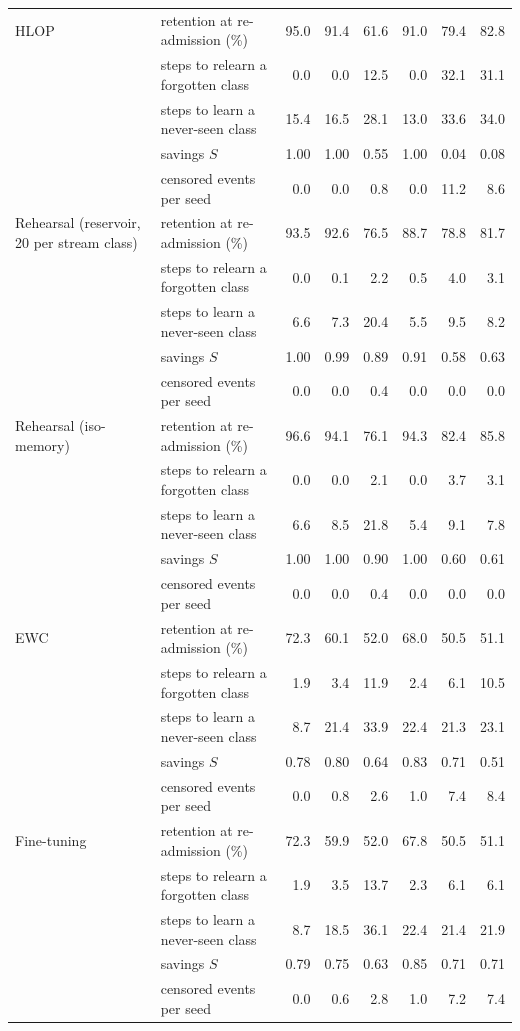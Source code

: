 \begin{tabular*}{\textwidth}{@{\extracolsep{\fill}}lp{3.2cm}rrrrrr@{}}
HLOP & retention at re-admission (\%) & 95.0 & 91.4 & 61.6 & 91.0 & 79.4 & 82.8 \\
 & steps to relearn a forgotten class & 0.0 & 0.0 & 12.5 & 0.0 & 32.1 & 31.1 \\
 & steps to learn a never-seen class & 15.4 & 16.5 & 28.1 & 13.0 & 33.6 & 34.0 \\
 & savings $S$ & 1.00 & 1.00 & 0.55 & 1.00 & 0.04 & 0.08 \\
 & censored events per seed & 0.0 & 0.0 & 0.8 & 0.0 & 11.2 & 8.6 \\
Rehearsal (reservoir, 20 per stream class) & retention at re-admission (\%) & 93.5 & 92.6 & 76.5 & 88.7 & 78.8 & 81.7 \\
 & steps to relearn a forgotten class & 0.0 & 0.1 & 2.2 & 0.5 & 4.0 & 3.1 \\
 & steps to learn a never-seen class & 6.6 & 7.3 & 20.4 & 5.5 & 9.5 & 8.2 \\
 & savings $S$ & 1.00 & 0.99 & 0.89 & 0.91 & 0.58 & 0.63 \\
 & censored events per seed & 0.0 & 0.0 & 0.4 & 0.0 & 0.0 & 0.0 \\
Rehearsal (iso-memory) & retention at re-admission (\%) & 96.6 & 94.1 & 76.1 & 94.3 & 82.4 & 85.8 \\
 & steps to relearn a forgotten class & 0.0 & 0.0 & 2.1 & 0.0 & 3.7 & 3.1 \\
 & steps to learn a never-seen class & 6.6 & 8.5 & 21.8 & 5.4 & 9.1 & 7.8 \\
 & savings $S$ & 1.00 & 1.00 & 0.90 & 1.00 & 0.60 & 0.61 \\
 & censored events per seed & 0.0 & 0.0 & 0.4 & 0.0 & 0.0 & 0.0 \\
EWC & retention at re-admission (\%) & 72.3 & 60.1 & 52.0 & 68.0 & 50.5 & 51.1 \\
 & steps to relearn a forgotten class & 1.9 & 3.4 & 11.9 & 2.4 & 6.1 & 10.5 \\
 & steps to learn a never-seen class & 8.7 & 21.4 & 33.9 & 22.4 & 21.3 & 23.1 \\
 & savings $S$ & 0.78 & 0.80 & 0.64 & 0.83 & 0.71 & 0.51 \\
 & censored events per seed & 0.0 & 0.8 & 2.6 & 1.0 & 7.4 & 8.4 \\
Fine-tuning & retention at re-admission (\%) & 72.3 & 59.9 & 52.0 & 67.8 & 50.5 & 51.1 \\
 & steps to relearn a forgotten class & 1.9 & 3.5 & 13.7 & 2.3 & 6.1 & 6.1 \\
 & steps to learn a never-seen class & 8.7 & 18.5 & 36.1 & 22.4 & 21.4 & 21.9 \\
 & savings $S$ & 0.79 & 0.75 & 0.63 & 0.85 & 0.71 & 0.71 \\
 & censored events per seed & 0.0 & 0.6 & 2.8 & 1.0 & 7.2 & 7.4 \\
\bottomrule
\end{tabular*}

